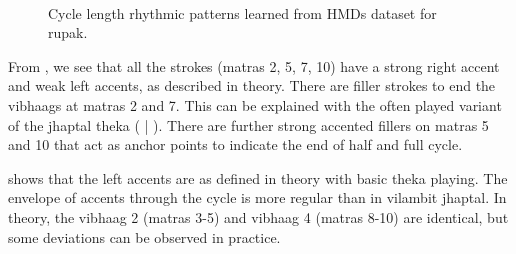 \begin{figure}[t]
\captionsetup[subfigure]{labelformat=empty}
\centering
{} \\ \vspace{-1.35cm}
\caption[Rhythm patterns in \gls{rupak} learned from \acrshort{HMDs} dataset]{Cycle length rhythmic patterns learned from \acrshort{HMDs} dataset for \gls{rupak}.}\label{fig:tt:HMDs:rupak}
\end{figure}
%
\begin{description}[style=unboxed,leftmargin=0cm]
\item[\textbf{\Gls{vilambit} \gls{jhaptal}}:] From , we see that all the  strokes (\glspl{matra} 2, 5, 7, 10) have a strong right accent and weak left accents, as described in theory. There are filler strokes to end the \glspl{vibhaag} at \glspl{matra} 2 and 7. This can be explained with the often played variant of the \gls{jhaptal} \gls{theka} (     |     ). There are further strong accented fillers on \glspl{matra} 5 and 10 that act as anchor points to indicate the end of half and full cycle. 
%
\item[\textbf{\Gls{madhyam} and \gls{dhrut} \gls{lay} \gls{jhaptal}}:]  shows that the left accents are as defined in theory with basic \gls{theka} playing. The envelope of accents through the cycle is more regular than in \gls{vilambit} \gls{jhaptal}. In theory, the \gls{vibhaag} 2 (\glspl{matra} 3-5) and \gls{vibhaag} 4 (\glspl{matra} 8-10) are identical, but some deviations can be observed in practice. %
\end{description}
%
